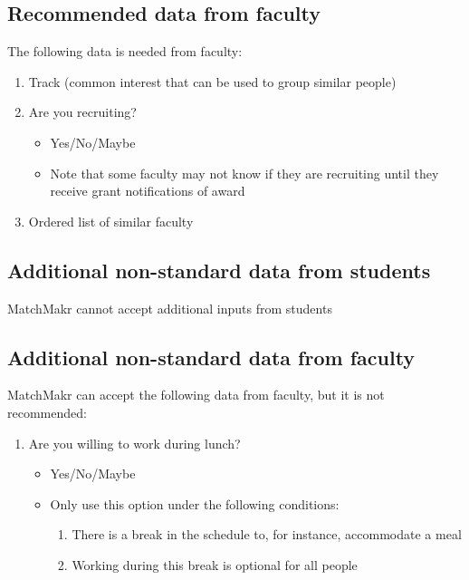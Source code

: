\subsection{Recommended data from faculty}
The following data is needed from faculty:
\begin{enumerate}
	\itemsep0em
	\item Track (common interest that can be used to group similar people)
	\item Are you recruiting?
		\begin{itemize}
			\itemsep0em
			\item Yes/No/Maybe
			\item Note that some faculty may not know if they are recruiting until they receive grant notifications of award
		\end{itemize}
	\item Ordered list of similar faculty
\end{enumerate}

\subsection{Additional non-standard data from students}
MatchMakr cannot accept additional inputs from students

\subsection{Additional non-standard data from faculty}
MatchMakr can accept the following data from faculty, but it is not recommended:
\begin{enumerate}
	\itemsep0em
	\item Are you willing to work during lunch?
		\begin{itemize}
			\itemsep0em
			\item Yes/No/Maybe
			\item Only use this option under the following conditions:
				\begin{enumerate}
					\itemsep0em
					\item There is a break in the schedule to, for instance, accommodate a meal
					\item Working during this break is optional for all people
				\end{enumerate}
		\end{itemize}
\end{enumerate}

